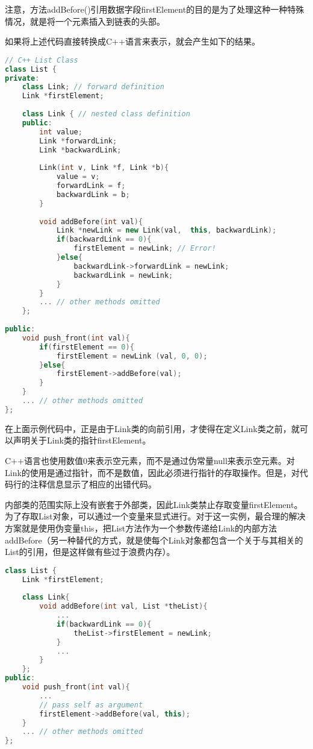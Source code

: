 注意，方法addBefore()引用数据字段firstElement的目的是为了处理这种一种特殊情况，就是将一个元素插入到链表的头部。

如果将上述代码直接转换成C++语言来表示，就会产生如下的结果。


\begin{lstlisting}[language=C++]
// C++ List Class
class List {
private:
	class Link; // forward definition
	Link *firstElement;
	
	class Link { // nested class definition
	public:
		int value;
		Link *forwardLink;
		Link *backwardLink;
		
		Link(int v, Link *f, Link *b){
			value = v;
			forwardLink = f;
			backwardLink = b;
		}
		
		void addBefore(int val){
			Link *newLink = new Link(val,  this, backwardLink);
			if(backwardLink == 0){
				firstElement = newLink; // Error!
			}else{
				backwardLink->forwardLink = newLink;
				backwardLink = newLink;
			}
		}
		... // other methods omitted
	};
	
public:
	void push_front(int val){
		if(firstElement == 0){
			firstElement = newLink (val, 0, 0);
		}else{
			firstElement->addBefore(val);
		}
	}
	... // other methods omitted
};
\end{lstlisting}


在上面示例代码中，正是由于Link类的向前引用，才使得在定义Link类之前，就可以声明关于Link类的指针firstElement。

C++语言也使用数值0来表示空元素，而不是通过伪常量null来表示空元素。对Link的使用是通过指针，而不是数值，因此必须进行指针的存取操作。但是，对代码行的注释信息显示了相应的出错代码。

内部类的范围实际上没有嵌套于外部类，因此Link类禁止存取变量firstElement。为了存取List对象，可以通过一个变量来显式进行。对于这一实例，最合理的解决方案就是使用伪变量this，把List方法作为一个参数传递给Link的内部方法addBefore（另一种替代的方式，就是使每个Link对象都包含一个关于与其相关的List的引用，但是这样做有些过于浪费内存）。



\begin{lstlisting}[language=C++]
class List {
	Link *firstElement;
	
	class Link{
		void addBefore(int val, List *theList){
			...
			if(backwardLink == 0){
				theList->firstElement = newLink;
			}
			...
		}
	};
public:
	void push_front(int val){
		...
		// pass self as argument
		firstElement->addBefore(val, this);
	}
	... // other methods omitted
};
\end{lstlisting}

